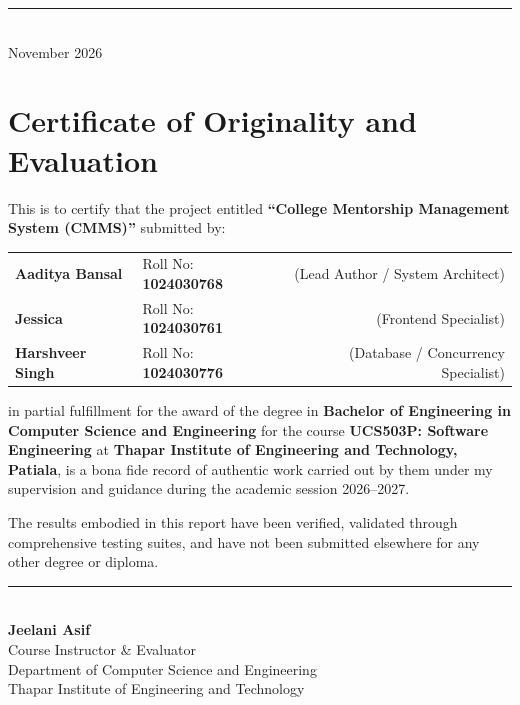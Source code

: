 \documentclass[11pt,a4paper]{article}
\begin{document}
\begin{titlepage}
  \vfill
  \rule{0.6\linewidth}{0.4pt} \\
  {\small\textsf{November 2026}}
\end{titlepage}

\newpage
{}

\section*{Certificate of Originality and Evaluation}
\vspace{0.8cm}

This is to certify that the project entitled \textbf{``College Mentorship Management System (CMMS)''} submitted by:
\begin{center}
\begin{tabular}{llr}
\textbf{Aaditya Bansal} & Roll No: \textbf{1024030768} & (Lead Author / System Architect) \\
\textbf{Jessica} & Roll No: \textbf{1024030761} & (Frontend Specialist) \\
\textbf{Harshveer Singh} & Roll No: \textbf{1024030776} & (Database / Concurrency Specialist) \\
\end{tabular}
\end{center}
in partial fulfillment for the award of the degree in \textbf{Bachelor of Engineering in Computer Science and Engineering} for the course \textbf{UCS503P: Software Engineering} at \textbf{Thapar Institute of Engineering and Technology, Patiala}, is a bona fide record of authentic work carried out by them under my supervision and guidance during the academic session 2026--2027.

The results embodied in this report have been verified, validated through comprehensive testing suites, and have not been submitted elsewhere for any other degree or diploma.

\vspace{2.5cm}

\begin{center}
\begin{minipage}{0.55\textwidth}
  \centering
  \rule{\linewidth}{0.5pt}\\[0.2cm]
  \textbf{Jeelani Asif}\\[0.1cm]
  Course Instructor \& Evaluator\\[0.1cm]
  Department of Computer Science and Engineering\\[0.1cm]
  Thapar Institute of Engineering and Technology
\end{minipage}
\end{center}
\end{document}
